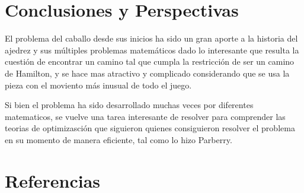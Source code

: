 \documentclass[journal, 10pt]{IEEEtran}
\begin{document}
\section{Conclusiones y Perspectivas}
El problema del caballo desde sus inicios ha sido un gran aporte a la historia del ajedrez y sus m\'ultiples problemas matem\'aticos dado lo interesante que resulta la cuesti\'on de encontrar un camino tal que cumpla la restricci\'on de ser un camino de Hamilton, y se hace mas atractivo y complicado considerando que se usa la pieza con el moviento m\'as inusual de todo el juego. 

Si bien el problema ha sido desarrollado muchas veces por diferentes matematicos, se vuelve una tarea interesante de resolver para comprender las teorias de optimizasci\'on que siguieron quienes consiguieron resolver el problema en su momento de manera eficiente, tal como lo hizo Parberry.








\section{Referencias}


\end{document}
